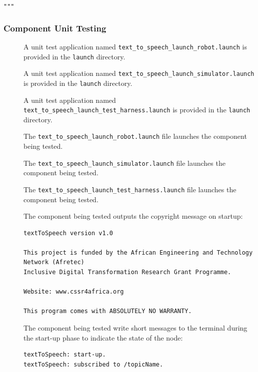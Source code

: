 \documentclass{CSSRforAfrica}
\newcommand{\checkboxChecked}{\fbox{\ding{51}}} %
\newcommand{\checkboxDashed}{\fbox{--}}         %
\begin{document}
\noindent \verb+"""+

\subsubsection{Component Unit Testing}

\begin{description}

\item[\checkboxDashed] A unit test application named {\small \verb+text_to_speech_launch_robot.launch+} is provided in the {\small \verb+launch+} directory. 

\item[\checkboxDashed] A unit test application named {\small \verb+text_to_speech_launch_simulator.launch+} is provided in the {\small \verb+launch+} directory.

\item[\checkboxDashed] A unit test application named {\small \verb+text_to_speech_launch_test_harness.launch+} is provided in the {\small \verb+launch+} directory.

\item[\checkboxDashed] The {\small \verb+text_to_speech_launch_robot.launch+} file  launches the component being tested.

\item[\checkboxDashed] The {\small \verb+text_to_speech_launch_simulator.launch+} file  launches the component being tested.

\item[\checkboxDashed] The {\small \verb+text_to_speech_launch_test_harness.launch+} file  launches the component being tested.

\item[\checkboxChecked] The component being tested outputs the copyright message on startup:  \\ 
{\scriptsize
\begin{verbatim}
textToSpeech version v1.0

This project is funded by the African Engineering and Technology Network (Afretec) 
Inclusive Digital Transformation Research Grant Programme. 

Website: www.cssr4africa.org

This program comes with ABSOLUTELY NO WARRANTY.
\end{verbatim}
}

\item[\checkboxChecked] The component being tested write short messages to the terminal  during the start-up phase to indicate the state of the node:
{\small
\begin{verbatim}
textToSpeech: start-up.
textToSpeech: subscribed to /topicName.
\end{verbatim}
} 


\end{description}
\end{document}
